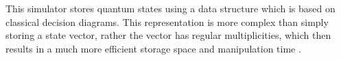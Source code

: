 This simulator stores quantum states using a data structure which is based on classical decision diagrams. This representation is more complex than simply storing a state vector, rather the vector has regular multiplicities, which then results in a much more efficient storage
space and manipulation time \citep {navehC21}. %




